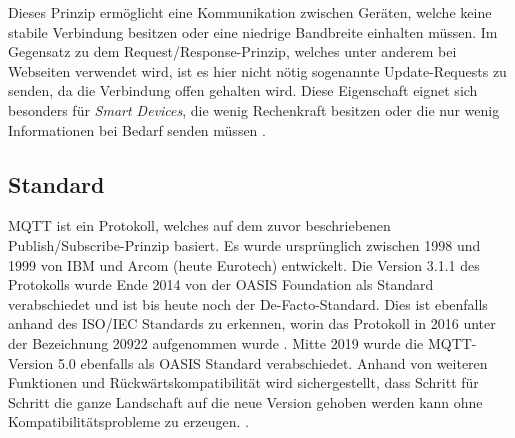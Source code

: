     Dieses Prinzip ermöglicht eine Kommunikation zwischen Geräten, welche keine stabile Verbindung besitzen oder eine niedrige Bandbreite einhalten müssen. Im Gegensatz zu dem Request/Response-Prinzip, welches unter anderem bei Webseiten verwendet wird, ist es hier nicht nötig sogenannte \glqq Update-Requests\grqq{} zu senden, da die Verbindung offen gehalten wird.
    Diese Eigenschaft eignet sich besonders für \emph{Smart Devices}, die wenig Rechenkraft besitzen oder die nur wenig Informationen bei Bedarf senden müssen \cite{Hwang2016}.

    \subsection{Standard}
        \ac{MQTT} ist ein Protokoll, welches auf dem zuvor beschriebenen Publish/Subscribe-Prinzip basiert. Es wurde ursprünglich zwischen 1998 und 1999 von IBM und Arcom (heute Eurotech) entwickelt. Die Version 3.1.1 des Protokolls wurde Ende 2014 von der OASIS Foundation als Standard verabschiedet und ist bis heute noch der De-Facto-Standard. Dies ist ebenfalls anhand des ISO/IEC Standards zu erkennen, worin das Protokoll in 2016 unter der Bezeichnung 20922 aufgenommen wurde \cite{eclipse_foundation2017}. Mitte 2019 wurde die MQTT-Version 5.0 ebenfalls als OASIS Standard verabschiedet. Anhand von weiteren Funktionen und Rückwärtskompatibilität wird sichergestellt, dass Schritt für Schritt die ganze Landschaft auf die neue Version gehoben werden kann ohne Kompatibilitätsprobleme zu erzeugen. \cite{mqtt_org_2019}.
        
